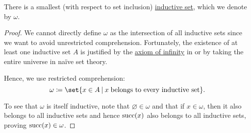 \begin{proposition}\label{thm:smallest_inductive_set_existence}
  There is a smallest (with respect to set inclusion) \hyperref[def:inductive_set]{inductive set}, which we denote by \( \omega \).
\end{proposition}
\begin{proof}
  We cannot directly define \( \omega \) as the intersection of all inductive sets since we want to avoid unrestricted comprehension. Fortunately, the existence of at least one inductive set \( A \) is justified by the \hyperref[def:zfc/infinity]{axiom of infinity} in  or by taking the entire universe in na\"ive set theory.

  Hence, we use restricted comprehension:
  \begin{equation*}
    \omega \coloneqq \set{ x \in A \given x \T{belongs to every inductive set} }.
  \end{equation*}

  To see that \( \omega \) is itself inductive, note that \( \varnothing \in \omega \) and that if \( x \in \omega \), then it also belongs to all inductive sets and hence \( \operatorname{succ}(x) \) also belongs to all inductive sets, proving \( \operatorname{succ}(x) \in \omega \).
\end{proof}

